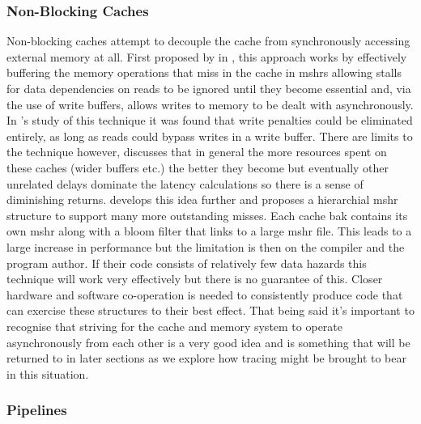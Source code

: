 \subsubsection{Non-Blocking Caches}

\label{sec:non-blocking}

Non-blocking caches attempt to decouple the cache from synchronously accessing external memory at all. First proposed by \citet{kroftLockupfreeInstructionFetch1981} in \citeyear{kroftLockupfreeInstructionFetch1981}, this approach works by effectively buffering the memory operations that miss in the cache in \gls{mshr}s allowing stalls for data dependencies on reads to be ignored until they become essential and, via the use of write buffers, allows writes to memory to be dealt with asynchronously. In \citet{chenReducingMemoryLatency1992}'s study of this technique it was found that write penalties could be eliminated entirely, as long as reads could bypass writes in a write buffer. There are limits to the technique however, \citet{belaynehDiscussionNonblockingLockupfree1996} discusses that in general the more resources spent on these caches (wider buffers etc.) the better they become but eventually other unrelated delays dominate the latency calculations so there is a sense of diminishing returns. \citet{tuckScalableCacheMiss2006} develops this idea further and proposes a hierarchial \gls{mshr} structure to support many more outstanding misses. Each cache bak contains its own \gls{mshr} along with a bloom filter that links to a large \gls{mshr} file. This leads to a large increase in performance but the limitation is then on the compiler and the program author. If their code consists of relatively few data hazards this technique will work very effectively but there is no guarantee of this. Closer hardware and software co-operation is needed to consistently produce code that can exercise these structures to their best effect. That being said it's important to recognise that striving for the cache and memory system to operate asynchronously from each other is a very good idea and is something that will be returned to in later sections as we explore how tracing might be brought to bear in this situation.

\subsubsection{Pipelines}


